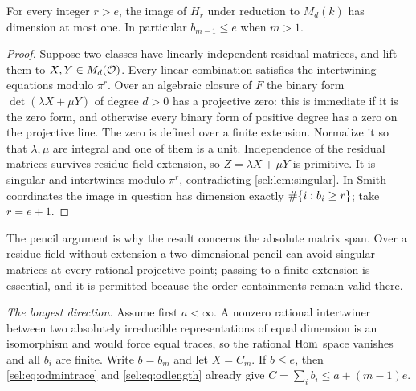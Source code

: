 \begin{lemma}\label{sel:lem:pencil}
For every integer $r>e$, the image of $H_r$ under reduction to $M_d(k)$ has
dimension at most one. In particular $b_{m-1}\le e$ when $m>1$.
\end{lemma}

\begin{proof}
Suppose two classes have linearly independent residual matrices, and lift
them to $X,Y\in M_d(\mathcal{O})$. Every linear combination satisfies the
intertwining equations modulo $\pi^r$. Over an algebraic closure of $F$ the
binary form $\det(\lambda X+\mu Y)$ of degree $d>0$ has a projective zero:
this is immediate if it is the zero form, and otherwise every binary form
of positive degree has a zero on the projective line. The zero is defined
over a finite extension. Normalize it so that $\lambda,\mu$ are integral and
one of them is a unit. Independence of the residual matrices survives
residue-field extension, so $Z=\lambda X+\mu Y$ is primitive. It is singular
and intertwines modulo $\pi^r$, contradicting \cref{sel:lem:singular}. In
Smith coordinates the image in question has dimension exactly
$\#\{i:b_i\ge r\}$; take $r=e+1$.
\end{proof}

The pencil argument is why the result concerns the absolute matrix span.
Over a residue field without extension a two-dimensional pencil can avoid
singular matrices at every rational projective point; passing to a finite
extension is essential, and it is permitted because the order containments
remain valid there.

\emph{The longest direction.} Assume first $a<\infty$. A nonzero rational
intertwiner between two absolutely irreducible representations of equal
dimension is an isomorphism and would force equal traces, so the rational
$\operatorname{Hom}$ space vanishes and all $b_i$ are finite. Write $b=b_m$ and let
$X=C_m$. If $b\le e$, then \eqref{sel:eq:odmintrace} and
\eqref{sel:eq:odlength} already give $C=\sum_ib_i\le a+(m-1)e$.

